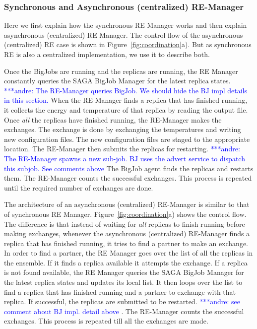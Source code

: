 \documentclass{rspublic}
\newcommand{\jhanote}[1]{ {\textcolor{red} { ***shantenu: #1 }}}
\newcommand{\alnote}[1]{ {\textcolor{blue} { ***andre: #1 }}}
\newcommand{\alnote}[1]{}
\newcommand{\jhanote}[1]{}
\begin{document}
\subsubsection{Synchronous and Asynchronous (centralized) RE-Manager}

Here we first explain how the synchronous RE Manager works and then explain asynchronous (centralized) RE Manager. The control flow of the asynchronous (centralized) RE case is shown in
Figure~\ref{fig:coordination}a). But as synchronous RE is also a centralized implementation, we use it to describe both. %

Once the BigJobs are running and the replicas are running, the RE Manager constantly queries the SAGA BigJob Manager for the latest replica states. \alnote{The RE-Manager queries BigJob. We should hide
  the BJ impl details in this section.}  When the RE-Manager finds a
replica that has finished running, it collects the energy and
temperature of that replica by reading the output file. Once
\emph{all} the replicas have finished running, the RE-Manager makes
the exchanges. The exchange is done by exchanging the temperatures and
writing new configuration files. The new configuration files are staged to the appropriate location. The RE-Manager then submits the replicas for restarting.  \alnote{The RE-Manager spawns a new sub-job. BJ uses the
  advert service to dispatch this subjob. See comments above} The
BigJob agent finds the replicas and restarts them. The RE-Manager
counts the successful exchanges. This process is repeated until the
required number of exchanges are done.

The architecture of an asynchronous (centralized) RE-Manager is similar to that of synchronous RE Manager. 
Figure~\ref{fig:coordination}a) shows the control flow. The difference is that instead of waiting 
for \emph{all} replicas to finish running before making exchanges, whenever the 
asynchronous (centralized) RE-Manager finds a replica that 
has finished running, it tries to find a partner to make an exchange. In order to find a partner, the RE Manager goes over the list of all the replicas in the ensemble. If it finds a replica available it attempts the exchange. If a replica is not found available, the RE Manager queries the SAGA BigJob Manager for the latest replica states and updates its local list. It then loops over the list to find a replica that has finished running and a partner to exchange with that replica.
If successful, the replicas are submitted to be restarted. \alnote{see comment about BJ impl. detail above}. 
The RE-Manager counts the successful 
exchanges. This process is repeated till all the exchanges are made. 
\end{document}
